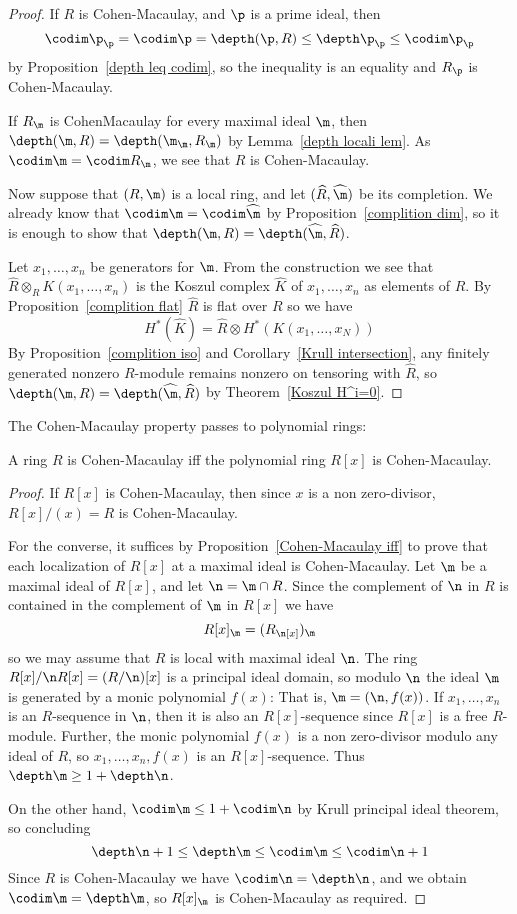 \begin{proof}
If $R$ is Cohen-Macaulay, and $\p$ is a prime ideal, then 
\[\codim\p_\p=\codim\p=\depth(\p,R)\leq\depth\p_\p\leq\codim\p_\p\] 
by Proposition~\ref{depth leq codim}, so the inequality is an equality and $R_\p$ is Cohen-Macaulay.\par 
If $R_\m$ is CohenMacaulay for every maximal ideal $\m$, then $\depth(\m,R)=\depth(\m_\m,R_\m)$ by Lemma~\ref{depth locali lem}. As $\codim\m=\codim R_\m$, we see that $R$ is Cohen-Macaulay.\par
Now suppose that $(R,\m)$ is a local ring, and let $(\widehat{R},\widehat{\m})$ be its completion. We already know that $\codim\m=\codim\widehat{\m}$ by Proposition~\ref{complition dim}, so it is enough to show that $\depth(\m,R)=\depth(\widehat{\m},\widehat{R})$.\par
Let $x_1,\dots,x_n$ be generators for $\m$. From the construction we see that $\widehat{R}\otimes_RK(x_1,\dots,x_n)$ is the Koszul complex $\widehat{K}$ of $x_1,\dots,x_n$ as elements of $\widehat{R}$. By Proposition~\ref{complition flat} $\widehat{R}$ is flat over $R$ so we have \[H^*(\widehat{K})=\widehat{R}\otimes H^*(K(x_1,\dots,x_N))\]
By Proposition~\ref{complition iso} and Corollary~\ref{Krull intersection}, any finitely generated nonzero $R$-module remains nonzero on tensoring with $\widehat{R}$, so $\depth(\m,R)=\depth(\widehat{\m},\widehat{R})$ by Theorem~\ref{Koszul H^i=0}.
\end{proof}
The Cohen-Macaulay property passes to polynomial rings:
\begin{proposition}\label{Cohen polynomial}
A ring $R$ is Cohen-Macaulay iff the polynomial ring $R[x]$ is Cohen-Macaulay.
\end{proposition}
\begin{proof}
If $R[x]$ is Cohen-Macaulay, then since $x$ is a non zero-divisor, $R[x]/(x)=R$ is Cohen-Macaulay.\par
For the converse, it suffices by Proposition~\ref{Cohen-Macaulay iff} to prove that each localization of $R[x]$ at a maximal ideal is Cohen-Macaulay. Let $\m$ be a maximal ideal of $R[x]$, and let $\n=\m\cap R$. Since the complement of $\n$ in $R$ is contained in the complement of  $\m$ in $R[x]$ we have
\[R[x]_\m=(R_\n[x])_\m\]
so we may assume that $R$ is local with maximal ideal $\n$. The ring $R[x]/\n R[x]=(R/\n)[x]$ is a principal ideal domain, so modulo $\n$ the ideal $\m$ is generated by a monic polynomial $f(x)$: That is, $\m=(\n,f(x))$. If $x_1,\dots,x_n$ is an $R$-sequence in $\n$, then it is also an $R[x]$-sequence since $R[x]$ is a free $R$-module. Further, the monic polynomial $f(x)$ is a non zero-divisor modulo any ideal of $R$, so $x_1,\dots,x_n,f(x)$ is an $R[x]$-sequence. Thus $\depth\m\geq 1+\depth\n$.\par
On the other hand, $\codim\m\leq 1+\codim\n$ by Krull principal ideal theorem, so concluding
\[\depth\n+1\leq\depth\m\leq\codim\m\leq\codim\n+1\] 
Since $R$ is Cohen-Macaulay we have $\codim\n=\depth\n$, and we
obtain $\codim\m=\depth\m$, so $R[x]_\m$ is Cohen-Macaulay as required.
\end{proof}
